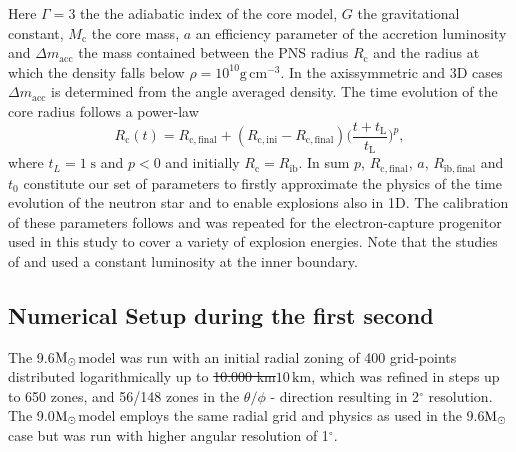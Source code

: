 \documentclass[fleqn,usenatbib]{mnras}
\newcommand{\solm}{\xspace\ensuremath{\rm{M_{\odot}}}}
\newcommand{\gcc}{\text{g}\, \text{cm}^{-3}}
\newcommand{\NY}[2]{{\color{blue}\sout{#1}#2}}
\begin{document}
Here $\Gamma = 3$ the the adiabatic index of the core model, $G$ the gravitational constant, $M_{\mathrm{c}}$ the core mass, $a$ an efficiency parameter of the accretion luminosity and $\Delta m_{\mathrm{acc}}$ the mass contained between the PNS radius $R_\mathrm{c}$ and the radius at which the density falls below $\rho=10^{10}\gcc$. 
In the axissymmetric and 3D cases $\Delta m_{\mathrm{acc}}$ is determined from the angle averaged density.
The time evolution of the core radius follows a power-law 
\begin{equation}
    R_{\mathrm{c}}(t) =R_{\mathrm{c,final}} + (R_{\mathrm{c,ini}} - R_{\mathrm{c,final}}) \Big( \frac{t+t_{\mathrm{L}}} {t_{\mathrm{L}}}  \Big)^p,
\end{equation}
where $t_L = 1 \; \mathrm{s}$ and $p < 0$ and  initially $R_{\mathrm{c}} = R_{\mathrm{ib}}$.
In sum $p$, $R_{\mathrm{c,final}}$, $a$, $R_{\mathrm{ib,final}}$ and $t_0$ constitute our set of parameters to firstly approximate the physics of the time evolution of the neutron star and to enable explosions also in 1D.
The calibration of these parameters follows \cite{Ertl2016} and was repeated for the electron-capture progenitor used in this study to cover a variety of explosion energies.
Note that the studies of \cite{Wongwathanarat2015} and \cite{Gessner2018} used a constant luminosity at the inner boundary. 

\subsection{Numerical Setup during the first second}

The 9.6\solm model was run with an initial radial zoning of 400 grid-points distributed logarithmically up to \NY{10.000 km}{$10\, \text{km}$}, which was refined in steps up to 650 zones, and 56/148 zones in the $\theta/\phi$ - direction resulting in 2$^\circ$ resolution.
The 9.0\solm model employs the same radial grid and physics as used in the 9.6\solm case but was run with higher angular resolution of 1$^\circ$.
\end{document}
